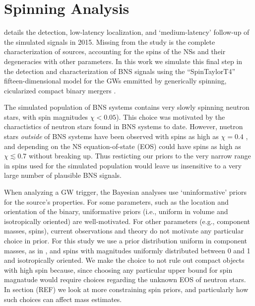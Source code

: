 \section{Spinning Analysis}

\citet{Singer_2014} details the detection, low-latency localization, and `medium-latency' follow-up of the simulated signals in 2015.  Missing from the study is the complete characterization of sources, accounting for the spins of the NSs and their degeneracies with other parameters.  In this work we simulate this final step in the detection and characterization of BNS signals using the ``SpinTaylorT4'' fifteen-dimensional model for the GWs emmitted by generically spinning, cicularized compact binary mergers \cite{Buonanno_2003,Buonanno_2009}. 

The simulated population of BNS systems contains very slowly spinning neutron stars, with spin magnitudes $\chi < 0.05$).  This choice was motivated by the charactistics of neutron stars found in BNS systems to date. However, nuetron stars \emph{outside} of BNS systems have been observed with spins as high as $\chi = 0.4$ \cite{Hessels_2006,Brown_2012}, and depending on the NS equation-of-state (EOS) could have spins as high as $\chi \lesssim 0.7$ \cite{Lo_2011} without breaking up.  Thus resticting our priors to the very narrow range in spins used for the simulated population would leave us insensitive to a very large number of plausible BNS signals.

When analyzing a GW trigger, the Bayesian analyses use `uninformative' priors for the source's properties.  For some parameters, such as the location and orientation of the binary, uniformative priors (i.e., uniform in volume and isotropically oriented) are well-motivated.  For other parameters (e.g., component masses, spins), current observations and theory do not motivate any particular choice in prior.  For this study we use a prior distribution uniform in component masses, as in \citet{2013arXiv1304.0670L}, and spins with magnitudes uniformly distributed between 0 and 1 and isotropically oriented.  We make the choice to not rule out compact objects with high spin because, since choosing any particular upper bound for spin magnatude would require choices regarding the unknown EOS of neutron stars.  In section (REF) we look at more constraining spin priors, and particularly how such choices can affect mass estimates.
